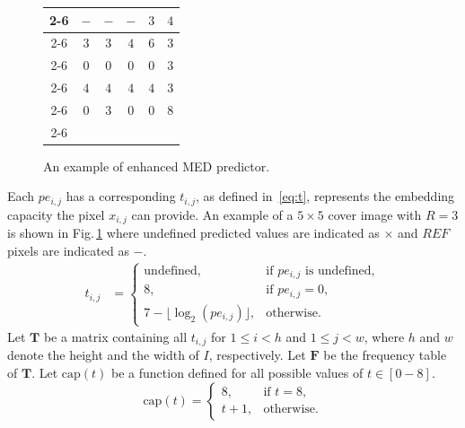 \documentclass[journal]{IEEEtran}
\begin{document}
\begin{figure}[!t]
\begin{tabular}{c|c|c|c|c|c|}
			\cline{2-6}
			\multirow{5}{*}{Embedding capacity}
			&\(-\) 		& \(-\) 	 & \(-\)	  & \(3\) & \(4\)  \\ \cline{2-6}
			&\(3\)      & \(3\)      & \(4\)      & \(6\) & \(3\)  \\ \cline{2-6}
			&\(0\)      & \(0\)      & \(0\)      & \(0\) & \(3\)  \\ \cline{2-6}
			&\(4\)      & \(4\)      & \(4\)      & \(4\) & \(3\)  \\ \cline{2-6} 
			&\(0\)      & \(3\)      & \(0\)      & \(0\) & \(8\)  \\ \cline{2-6}
			
		\end{tabular}
		\caption{An example of enhanced MED predictor.}
		\label{fig:xpv}
	\end{figure}
	
	Each \(pe_{i, j}\) has a corresponding \(t_{i, j}\), as defined in~\eqref{eq:t}, represents the embedding capacity the pixel \(x_{i, j}\) can provide.
	An example of a \(5 \times 5\) cover image with \(R = 3\) is shown in Fig.\,\ref{fig:xpv} where undefined predicted values are indicated as \(\times\) and \(REF\) pixels are indicated as \(-\).
%	
	\begin{align}
		\label{eq:t}
		t_{i, j} &= 
		\begin{cases}
			\text{undefined},             & \text{if } pe_{i, j} \text{ is undefined} ,\\
			8,&  \text{if } pe_{i, j} = 0,       \\
			7 - \lfloor \log_2(pe_{i, j}) \rfloor ,&  \text{otherwise.}
		\end{cases}  	
	\end{align}
%
	Let \(\mathbf{T}\) be a matrix containing all \(t_{i, j}\) for \(1 \leq i < h\) and \(1\leq j < w\), where \(h\) and \(w\) denote the height and the width of \(I\), respectively.
	Let \(\mathbf{F}\) be the frequency table of \(\mathbf{T}\).
	Let \(\mathrm{cap}(t)\) be a function defined for all possible values of \(t \in [0-8]\).
%	
	\begin{equation}
		\label{eq:cap}
		\mathrm{cap}(t) = 
		\begin{cases}
			8     ,&  \text{if } t = 8,       \\
			t + 1 ,&  \text{otherwise}.
		\end{cases} 
	\end{equation}
\end{document}
